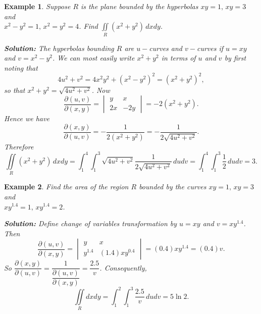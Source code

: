 \documentclass[titlepage,a4paper,12pt]{report}
\newtheorem{example}{Example}[section]
\begin{document}
\begin{example}
Suppose $R$ is the plane bounded by the hyperbolas $xy=1, \, xy=3$ and \\ $x^2-y^2=1, \, x^2=y^2=4$. Find $\displaystyle \iint \limits _R (x^2+y^2)\, dxdy$.

\noindent \textbf{Solution:} The hyperbolas bounding $R$ are $u-$curves and $v-$curves if $u=xy$ and $v=x^2-y^2$.  We can most easily write $x^2+y^2$ in terms of $u$ and $v$ by first noting that \[4u^2+v^2=4x^2y^2+(x^2-y^2)^2=(x^2+y^2)^2,\] so that $x^2+y^2=\sqrt{4u^2+v^2}$. Now 
\[\dfrac{\partial (u,v)}{\partial (x,y)}=\begin{vmatrix}
y & x \\
2x & -2y 
\end{vmatrix}=-2(x^2+y^2).\]
Hence we have 
\[\dfrac{\partial (x,y)}{\partial (u,v)}=-\dfrac{1}{2(x^2+y^2)}=-\dfrac{1}{2\sqrt{4u^2+v^2}}.\]
Therefore
\[\iint \limits _R (x^2+y^2)\, dxdy =\int _1^4\int _1^3 \sqrt{4u^2+v^2}\dfrac{1}{2\sqrt{4u^2+v^2}}\, dudv=\int _1^4\int _1^3\dfrac{1}{2}\, dudv=3.\] 
\end{example}
\begin{example}
Find the area of the region $R$ bounded by the curves $xy=1, \, xy=3$ and\\ $xy^{1.4}=1, \, xy^{1.4}=2$.

\noindent \textbf{Solution:} Define change of variables transformation by $u=xy$ and $v=xy^{1.4}$. Then 
\[\dfrac{\partial (u,v)}{\partial (x,y)}=\begin{vmatrix}
y & x \\
y^{1.4} & (1.4)xy^{0.4}
\end{vmatrix}=(0.4)xy^{1.4}=(0.4)v.\] So $\dfrac{\partial (x,y)}{\partial (u,v)}=\dfrac{1}{\dfrac{\partial (u,v)}{\partial (x,y)}}=\dfrac{2.5}{v}$. Consequently, 
\[\iint \limits _R dxdy =\int _1^2\int _1^3 \dfrac{2.5}{v}\, dudv=5\ln 2.\]
\end{example}
\end{document}
